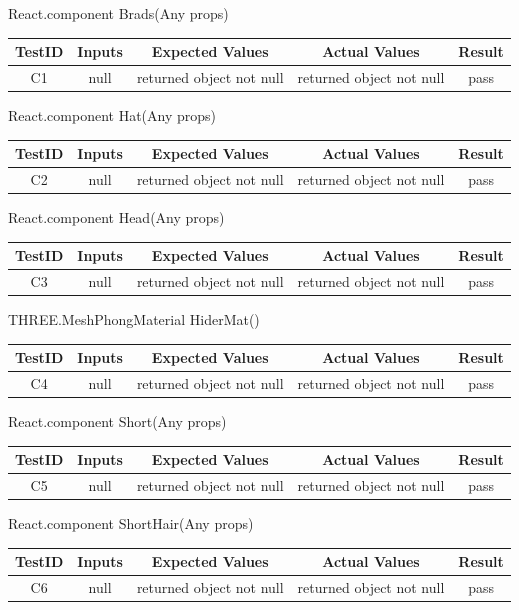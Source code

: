 \documentclass[12pt, oneside, openany, titlepage]{article}
\begin{document}
React.component Brads(Any props) \\
\begin{tabular}{ |c|c|c|c|c| } 
 \hline
 TestID & Inputs & Expected Values & Actual Values & Result \\ 
 \hline
 C1 & null & returned object not null & returned object not null & pass \\ 
 \hline
\end{tabular}

React.component Hat(Any props) \\
\begin{tabular}{ |c|c|c|c|c| } 
 \hline
 TestID & Inputs & Expected Values & Actual Values & Result \\ 
 \hline
 C2 & null & returned object not null & returned object not null & pass \\ 
 \hline
\end{tabular}

React.component Head(Any props) \\
\begin{tabular}{ |c|c|c|c|c| } 
 \hline
 TestID & Inputs & Expected Values & Actual Values & Result \\ 
 \hline
 C3 & null & returned object not null & returned object not null & pass \\ 
 \hline
\end{tabular}

THREE.MeshPhongMaterial HiderMat() \\
\begin{tabular}{ |c|c|c|c|c| } 
 \hline
 TestID & Inputs & Expected Values & Actual Values & Result \\ 
 \hline
 C4 & null & returned object not null & returned object not null & pass \\ 
 \hline
\end{tabular}

React.component Short(Any props) \\
\begin{tabular}{ |c|c|c|c|c| } 
 \hline
 TestID & Inputs & Expected Values & Actual Values & Result \\ 
 \hline
 C5 & null & returned object not null & returned object not null & pass \\ 
 \hline
\end{tabular}

React.component ShortHair(Any props) \\
\begin{tabular}{ |c|c|c|c|c| } 
 \hline
 TestID & Inputs & Expected Values & Actual Values & Result \\ 
 \hline
 C6 & null & returned object not null & returned object not null & pass \\ 
 \hline
\end{tabular}
\end{document}
